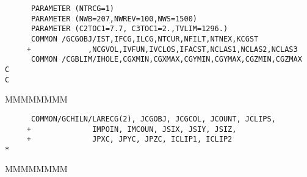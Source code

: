 \begin{verbatim}
      PARAMETER (NTRCG=1)
      PARAMETER (NWB=207,NWREV=100,NWS=1500)
      PARAMETER (C2TOC1=7.7, C3TOC1=2.,TVLIM=1296.)
      COMMON /GCGOBJ/IST,IFCG,ILCG,NTCUR,NFILT,NTNEX,KCGST
     +             ,NCGVOL,IVFUN,IVCLOS,IFACST,NCLAS1,NCLAS2,NCLAS3
      COMMON /CGBLIM/IHOLE,CGXMIN,CGXMAX,CGYMIN,CGYMAX,CGZMIN,CGZMAX
C
C
\end{verbatim}
\begin{DLtt}{MMMMMMMM}
\item[NTRCG]
\item[NWB]
\item[NWREV]
\item[NWS]
\item[C2TOC1]
\item[C3TOC1]
\item[TVLIM]
\item[IST]
\item[IFCG]
\item[ILCG]
\item[NTCUR]
\item[NFILT]
\item[NTNEX]
\item[KCGST]
\item[NCGVOL]
\item[IVFUN]
\item[IVCLOS]
\item[IFACST]
\item[NCLAS1]
\item[NCLAS2]
\item[NCLAS3]
\item[IHOLE]
\item[CGXMIN]
\item[CGXMAX]
\item[CGYMIN]
\item[CGYMAX]
\item[CGZMIN]
\item[CGZMAX]
\end{DLtt}
\begin{verbatim}
      COMMON/GCHILN/LARECG(2), JCGOBJ, JCGCOL, JCOUNT, JCLIPS,
     +              IMPOIN, IMCOUN, JSIX, JSIY, JSIZ,
     +              JPXC, JPYC, JPZC, ICLIP1, ICLIP2
*
\end{verbatim}
\begin{DLtt}{MMMMMMMM}
\item[LARECG]
\item[JCGOBJ]
\item[JCGCOL]
\item[JCOUNT]
\item[JCLIPS]
\item[IMPOIN]
\item[IMCOUN]
\item[JSIX]
\item[JSIY]
\item[JSIZ]
\item[JPXC]
\item[JPYC]
\item[JPZC]
\item[ICLIP1]
\item[ICLIP2]
\end{DLtt}
